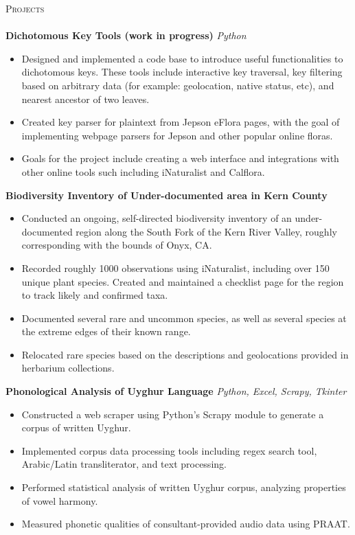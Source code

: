 \documentclass[]{article}
\newcommand{\lineunder} {
	\vspace*{-8pt} \\
	\hspace*{-18pt} \hrulefill \\
}
\newcommand{\header} [1] {
	{\hspace*{-18pt}\vspace*{6pt} \textsc{#1}}
	\vspace*{-6pt} \lineunder
}
\begin{document}
	\header{Projects}
	{\textbf{Dichotomous Key Tools (work in progress)}} \hspace*{5mm} {\sl Python} \\
	\vspace*{-5pt}\begin{itemize}	\itemsep 0pt
		\item Designed and implemented a code base to introduce useful functionalities to dichotomous keys.  These tools include interactive key traversal, key filtering based on arbitrary data (for example: geolocation, native status, etc), and nearest ancestor of two leaves. 
		\item Created key parser for plaintext from Jepson eFlora pages, with the goal of implementing webpage parsers for Jepson and other popular online floras.
		\item Goals for the project include creating a web interface and integrations with other online tools such including iNaturalist and Calflora.
	\end{itemize}
	\vspace*{0mm}

	{\textbf{Biodiversity Inventory of Under-documented area in Kern County}} \hspace*{5mm} \\
	\vspace*{-5pt}\begin{itemize}	\itemsep 0pt
		\item Conducted an ongoing, self-directed biodiversity inventory of an under-documented region along the South Fork of the Kern River Valley, roughly corresponding with the bounds of Onyx, CA.
		\item Recorded roughly 1000 observations using iNaturalist, including over 150 unique plant species.  Created and maintained a checklist page for the region to track likely and confirmed taxa.
		\item Documented several rare and uncommon species, as well as several species at the extreme edges of their known range.
		\item Relocated rare species based on the descriptions and geolocations provided in herbarium collections.
	\end{itemize}
	\vspace*{0mm}
	
	{\textbf{Phonological Analysis of Uyghur Language}} \hspace*{5mm} {\sl Python, Excel, Scrapy, Tkinter}
	\vspace*{-5pt}\begin{itemize}	\itemsep 0pt 
		\item Constructed a web scraper using Python's Scrapy module to generate a corpus of written Uyghur.
		\item Implemented corpus data processing tools including regex search tool, Arabic/Latin transliterator, and text processing.
		\item Performed statistical analysis of written Uyghur corpus, analyzing properties of vowel harmony.
		\item Measured phonetic qualities of consultant-provided audio data using PRAAT.
	\end{itemize}
	\vspace*{0mm}
	
\end{document}

